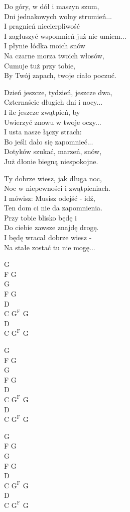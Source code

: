 \begin{text}
Do góry, w dół i maszyn szum,\\
Dni jednakowych wolny strumień...\\
I pragnień niecierpliwość\\
I zagłuszyć wspomnień już nie umiem...\\
\vin I płynie łódka moich snów\\
\vin Na czarne morza twoich włosów,\\
\vin Cumuje tuż przy tobie,\\
\vin By Twój zapach, twoje ciało poczuć.

Dzień jeszcze, tydzień, jeszcze dwa,\\
Czternaście długich dni i nocy...\\
I ile jeszcze zwątpień, by\\
Uwierzyć znowu w twoje oczy...\\
\vin I usta nasze łączy strach:\\
\vin Bo jeśli dało się zapomnieć...\\
\vin Dotyków szukać, marzeń, snów,\\
\vin Już dłonie biegną niespokojne.

Ty dobrze wiesz, jak długa noc,\\
Noc w niepewności i zwątpieniach.\\
I mówisz: Musisz odejść - idź,\\
Ten dom ci nie da zapomnienia.\\
\vin Przy tobie blisko będę i\\
\vin Do ciebie zawsze znajdę drogę.\\
\vin I będę wracał dobrze wiesz -\\
\vin Na stałe zostać tu nie mogę...
\end{text}
\begin{chord}
G\\
F G\\
G\\
F G\\
D\\
C $\mathrm{G^F}$ G\\
D\\
C $\mathrm{G^F}$ G

G\\
F G\\
G\\
F G\\
D\\
C $\mathrm{G^F}$ G\\
D\\
C $\mathrm{G^F}$ G

G\\
F G\\
G\\
F G\\
D\\
C $\mathrm{G^F}$ G\\
D\\
C $\mathrm{G^F}$ G
\end{chord}
